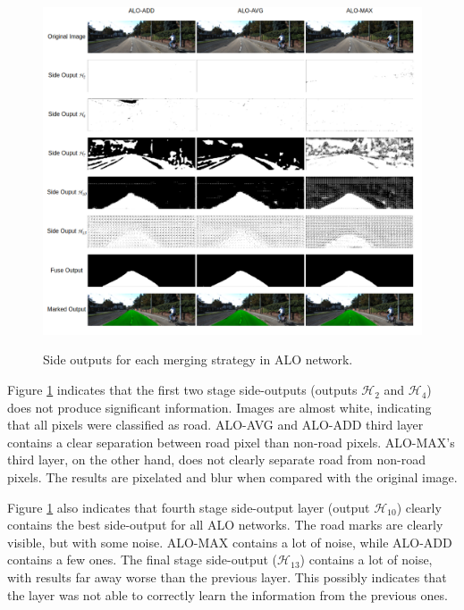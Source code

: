 
\begin{figure}
  \caption{Side outputs for each merging strategy in ALO network.}
  \centering
  \includegraphics[width=1.0\textwidth]{figures/falreis/side_outputs.png}
  \label{fig:side_outputs}
\end{figure}


Figure \ref{fig:side_outputs} indicates that the first two stage side-outputs (outputs $\mathcal{H}_2$ and $\mathcal{H}_4$) does not produce significant information. Images are almost white, indicating that all pixels were classified as road. ALO-AVG and ALO-ADD third layer contains a clear separation between road pixel than non-road pixels. ALO-MAX's third layer, on the other hand, does not clearly separate road from non-road pixels. The results are pixelated and blur when compared with the original image.

Figure \ref{fig:side_outputs} also indicates that fourth stage side-output layer (output $\mathcal{H}_{10}$) clearly contains the best side-output for all ALO networks. The road marks are clearly visible, but with some noise. ALO-MAX contains a lot of noise, while ALO-ADD contains a few ones. The final stage side-output ($\mathcal{H}_{13}$) contains a lot of noise, with results far away worse than the previous layer. This possibly indicates that the layer was not able to correctly learn the information from the previous ones.

